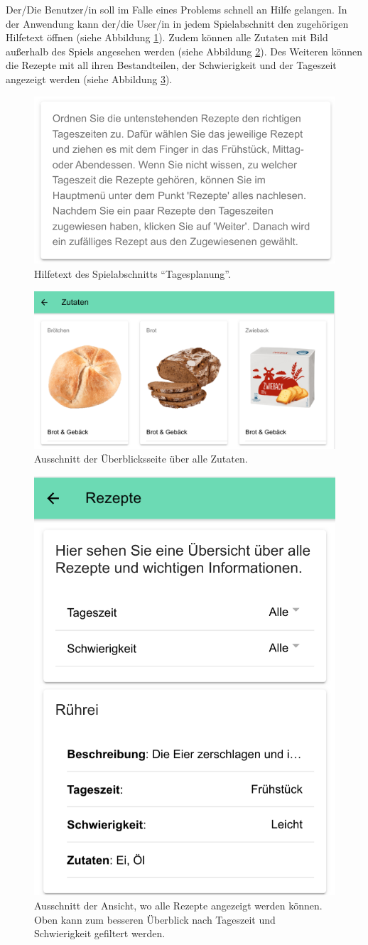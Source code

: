 Der/Die Benutzer/in soll im Falle eines Problems schnell an Hilfe gelangen. In der Anwendung kann der/die User/in in jedem Spielabschnitt den zugehörigen Hilfetext öffnen (siehe Abbildung \ref{fig:game-help-text}). Zudem können alle Zutaten mit Bild außerhalb des Spiels angesehen werden (siehe Abbildung \ref{fig:game-ingredient-info}). Des Weiteren können die Rezepte mit all ihren Bestandteilen, der Schwierigkeit und der Tageszeit angezeigt werden (siehe Abbildung \ref{fig:game-recipe-info}).

\begin{figure}[H]
    \centering
	\includegraphics[width=0.5\linewidth]{figures/development/application/helptext.png}
	\caption{Hilfetext des Spielabschnitts \enquote{Tagesplanung}.}
	\label{fig:game-help-text}
\end{figure}

\begin{figure}[H]
    \centering
	\includegraphics[width=0.5\linewidth]{figures/development/application/ingredient-info.png}
	\caption{Ausschnitt der Überblicksseite über alle Zutaten.}
	\label{fig:game-ingredient-info}
\end{figure}

\begin{figure}[H]
    \centering
	\includegraphics[width=0.35\linewidth]{figures/development/application/recipe-info.png}
	\caption{Ausschnitt der Ansicht, wo alle Rezepte angezeigt werden können. Oben kann zum besseren Überblick nach Tageszeit und Schwierigkeit gefiltert werden.}
	\label{fig:game-recipe-info}
\end{figure}